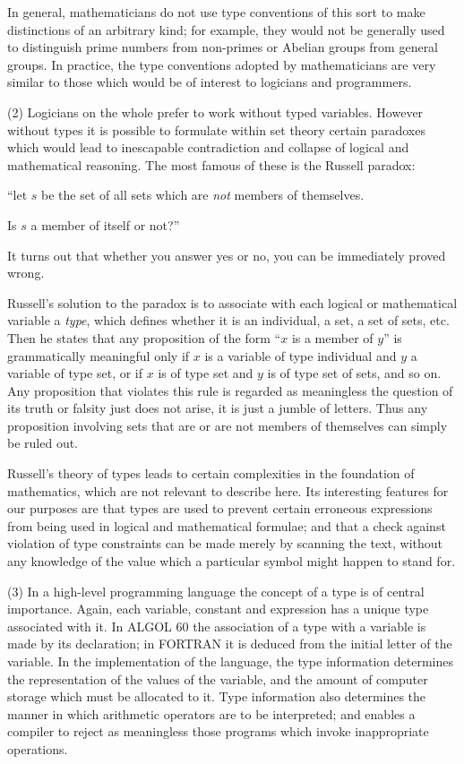In general, mathematicians do not use type conventions of this sort to make distinctions of an arbitrary kind; for example, they would not be generally used to distinguish prime numbers from non-primes or Abelian groups from general groups. In practice, the type conventions adopted by mathematicians are very similar to those which would be of interest to logicians and programmers.

(2) Logicians on the whole prefer to work without typed variables. However without types it is possible to formulate within set theory certain paradoxes which would lead to inescapable contradiction and collapse of logical and mathematical reasoning. The most famous of these is the Russell paradox:

\quad \hspace{-.4em}``let $s$ be the set of all sets which are \textit{not} members of themselves.

\quad Is $s$ a member of itself or not?''

\noindent
It turns out that whether you answer yes or no, you can be immediately proved wrong.

Russell's solution to the paradox is to associate with each logical or mathematical variable a \textit{type}, which defines whether it is an individual, a set, a set of sets, etc. Then he states that any proposition of the form ``$x$ is a member of $y$'' is grammatically meaningful only if $x$ is a variable of type individual and $y$ a variable of type set, or if $x$ is of type set and $y$ is of type set of sets, and so on. Any proposition that violates this rule is regarded as meaningless \textemdash{} the question of its truth or falsity just does not arise, it is just a jumble of letters. Thus any proposition involving sets that are or are not members of themselves can simply be ruled out.

Russell's theory of types leads to certain complexities in the foundation of mathematics, which are not relevant to describe here. Its interesting features for our purposes are that types are used to prevent certain erroneous expressions from being used in logical and mathematical formulae; and that a check against violation of type constraints can be made merely by scanning the text, without any knowledge of the value which a particular symbol might happen to stand for.

(3) In a high-level programming language the concept of a type is of central importance. Again, each variable, constant and expression has a unique type associated with it. In ALGOL 60 the association of a type with a variable is made by its declaration; in FORTRAN it is deduced from the initial letter of the variable. In the implementation of the language, the type information determines the representation of the values of the variable, and the amount of computer storage which must be allocated to it. Type information also determines the manner in which arithmetic operators are to be interpreted; and enables a compiler to reject as meaningless those programs which invoke inappropriate operations.

